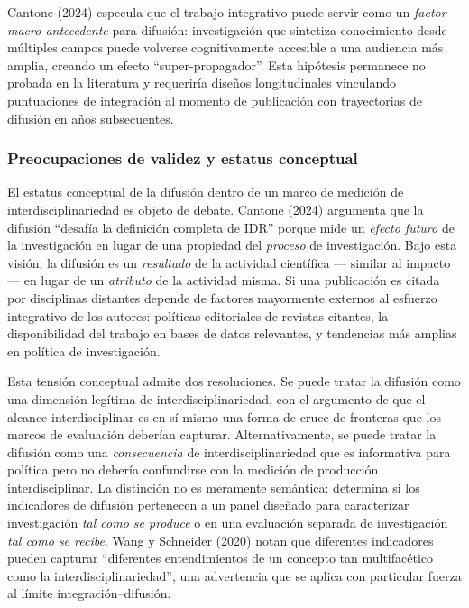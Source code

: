\documentclass[
]{article}
\begin{document}
Cantone (2024) especula que el trabajo integrativo puede servir como un
\emph{factor macro antecedente} para difusión: investigación que
sintetiza conocimiento desde múltiples campos puede volverse
cognitivamente accesible a una audiencia más amplia, creando un efecto
``super-propagador''. Esta hipótesis permanece no probada en la
literatura y requeriría diseños longitudinales vinculando puntuaciones
de integración al momento de publicación con trayectorias de difusión en
años subsecuentes.

\hypertarget{preocupaciones-de-validez-y-estatus-conceptual}{%
\subsubsection{Preocupaciones de validez y estatus
conceptual}\label{preocupaciones-de-validez-y-estatus-conceptual}}

El estatus conceptual de la difusión dentro de un marco de medición de
interdisciplinariedad es objeto de debate. Cantone (2024) argumenta que
la difusión ``desafía la definición completa de IDR'' porque mide un
\emph{efecto futuro} de la investigación en lugar de una propiedad del
\emph{proceso} de investigación. Bajo esta visión, la difusión es un
\emph{resultado} de la actividad científica --- similar al impacto ---
en lugar de un \emph{atributo} de la actividad misma. Si una publicación
es citada por disciplinas distantes depende de factores mayormente
externos al esfuerzo integrativo de los autores: políticas editoriales
de revistas citantes, la disponibilidad del trabajo en bases de datos
relevantes, y tendencias más amplias en política de investigación.

Esta tensión conceptual admite dos resoluciones. Se puede tratar la
difusión como una dimensión legítima de interdisciplinariedad, con el
argumento de que el alcance interdisciplinar es en sí mismo una forma de
cruce de fronteras que los marcos de evaluación deberían capturar.
Alternativamente, se puede tratar la difusión como una
\emph{consecuencia} de interdisciplinariedad que es informativa para
política pero no debería confundirse con la medición de producción
interdisciplinar. La distinción no es meramente semántica: determina si
los indicadores de difusión pertenecen a un panel diseñado para
caracterizar investigación \emph{tal como se produce} o en una
evaluación separada de investigación \emph{tal como se recibe}. Wang y
Schneider (2020) notan que diferentes indicadores pueden capturar
``diferentes entendimientos de un concepto tan multifacético como la
interdisciplinariedad'', una advertencia que se aplica con particular
fuerza al límite integración--difusión.
\end{document}
